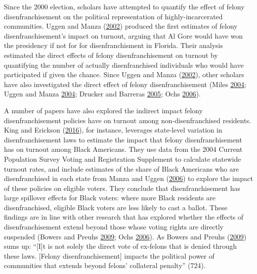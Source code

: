 \documentclass[12pt,]{article}
\begin{document}
Since the 2000 election, scholars have attempted to quantify the effect of felony disenfranchisement on the political representation of highly-incarcerated communities. Uggen and Manza (\protect\hyperlink{ref-Uggen2002}{2002}) produced the first estimates of felony disenfranchisement's impact on turnout, arguing that Al Gore would have won the presidency if not for for disenfranchisment in Florida. Their analysis estimated the direct effects of felony disenfranchisement on turnout by quantifying the number of actually disenfranchised individuals who would have participated if given the chance. Since Uggen and Manza (\protect\hyperlink{ref-Uggen2002}{2002}), other scholars have also investigated the direct effect of felony disenfranchisement (Miles \protect\hyperlink{ref-Miles2004}{2004}; Uggen and Manza \protect\hyperlink{ref-Uggen2004}{2004}; Drucker and Barreras \protect\hyperlink{ref-Drucker2005}{2005}; Ochs \protect\hyperlink{ref-Ochs2006}{2006}).

A number of papers have also explored the indirect impact felony disenfranchisement policies have on turnout among non-disenfranchised residents. King and Erickson (\protect\hyperlink{ref-King2016}{2016}), for instance, leverages state-level variation in disenfranchisement laws to estimate the impact that felony disenfranchisement has on turnout among Black Americans. They use data from the 2004 Current Population Survey Voting and Registration Supplement to calculate statewide turnout rates, and include estimates of the share of Black Americans who are disenfranchised in each state from Manza and Uggen (\protect\hyperlink{ref-locked_out}{2006}) to explore the impact of these policies on eligible voters. They conclude that disenfranchisement has large spillover effects for Black voters: where more Black residents are disenfranchised, eligible Black voters are less likely to cast a ballot. These findings are in line with other research that has explored whether the effects of disenfranchisement extend beyond those whose voting rights are directly suspended (Bowers and Preuhs \protect\hyperlink{ref-Bowers2009}{2009}; Ochs \protect\hyperlink{ref-Ochs2006}{2006}). As Bowers and Preuhs (\protect\hyperlink{ref-Bowers2009}{2009}) sums up: ``{[}I{]}t is not solely the direct vote of ex-felons that is denied through these laws. {[}Felony disenfranchisement{]} impacts the political power of communities that extends beyond felons' collateral penalty'' (724).
\end{document}
